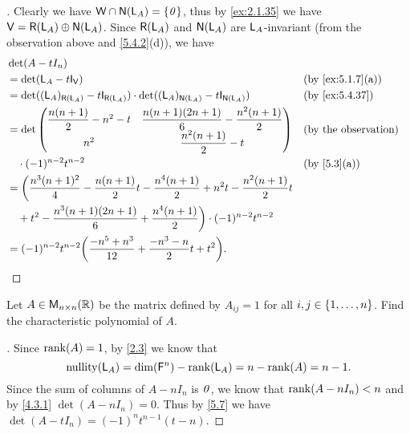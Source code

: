 \begin{proof}[]
  Clearly we have \(\W \cap \ns{\L_A} = \set{\zv}\), thus by \cref{ex:2.1.35} we have \(\V = \rg{\L_A} \oplus \ns{\L_A}\).
  Since \(\rg{\L_A}\) and \(\ns{\L_A}\) are \(\mathsf{L}_A\)-invariant (from the observation above and \cref{5.4.2}(d)), we have
  \begin{align*}
     & \det(A - t I_n)                                                                                                                            \\
     & = \det(\L_A - t \IT[\V])                                                                                             &  & \by{ex:5.1.7}[a] \\
     & = \det((\L_A)_{\rg{\L_A}} - t \IT[\rg{\L_A}]) \cdot \det((\L_A)_{\ns{\L_A}} - t \IT[\ns{\L_A}])                      &  & \by{ex:5.4.37}   \\
     & = \det\begin{pmatrix}
               \dfrac{n(n + 1)}{2} - n^2 - t & \dfrac{n(n + 1)(2n + 1)}{6} - \dfrac{n^2 (n + 1)}{2} \\
               n^2                           & \dfrac{n^2 (n + 1)}{2} - t
             \end{pmatrix}                              &  & \text{(by the observation)}                                                 \\
     & \quad \cdot (-1)^{n - 2} t^{n - 2}                                                                                   &  & \by{5.3}[a]      \\
     & = \bigg(\dfrac{n^3 (n + 1)^2}{4} - \dfrac{n(n + 1)}{2} t - \dfrac{n^4 (n + 1)}{2} + n^2 t - \dfrac{n^2 (n + 1)}{2} t                       \\
     & \quad + t^2 - \dfrac{n^3 (n + 1)(2n + 1)}{6} + \dfrac{n^4 (n + 1)}{2}\bigg) \cdot (-1)^{n - 2} t^{n - 2}                                   \\
     & = (-1)^{n - 2} t^{n - 2} \pa{\dfrac{-n^5 + n^3}{12} + \dfrac{-n^3 - n}{2} t + t^2}.
  \end{align*}
\end{proof}

\begin{ex}\label{ex:5.4.42}
  Let \(A \in \ms[n][n][\R]\) be the matrix defined by \(A_{i j} = 1\) for all \(i, j \in \left\lbrace1, \dots, n\right\rbrace\).
  Find the characteristic polynomial of \(A\).
\end{ex}

\begin{proof}[]
  Since \(\rk{A} = 1\), by \cref{2.3} we know that
  \[
    \nt{\L_A} = \dim(\vs{F}^n) - \rk{\L_A} = n - \rk{A} = n - 1.
  \]
  Since the sum of columns of \(A - n I_n\) is \(\mathit{0}\), we know that \(\rk{A - n I_n} < n\) and by \cref{4.3.1} \(\det(A - n I_n) = 0\).
  Thus by \cref{5.7} we have \(\det(A - t I_n) = (-1)^n t^{n - 1} (t - n)\).
\end{proof}
